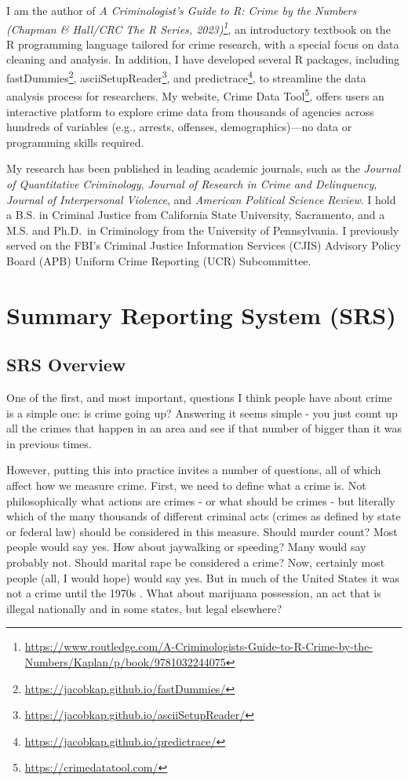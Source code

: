 \documentclass[
]{krantz}
\renewcommand{\href}[2]{#2\footnote{\url{#1}}}
\begin{document}
I am the author of
\emph{\href{https://www.routledge.com/A-Criminologists-Guide-to-R-Crime-by-the-Numbers/Kaplan/p/book/9781032244075}{A
Criminologist's Guide to R: Crime by the Numbers (Chapman \&
Hall/CRC The R Series, 2023)}}, an introductory textbook on
the R programming language tailored for crime research, with
a special focus on data cleaning and analysis. In addition,
I have developed several R packages, including
\href{https://jacobkap.github.io/fastDummies/}{fastDummies},
\href{https://jacobkap.github.io/asciiSetupReader/}{asciiSetupReader},
and
\href{https://jacobkap.github.io/predictrace/}{predictrace},
to streamline the data analysis process for researchers. My
website, \href{https://crimedatatool.com/}{Crime Data Tool},
offers users an interactive platform to explore crime data
from thousands of agencies across hundreds of variables
(e.g., arrests, offenses, demographics)---no data or
programming skills required.

My research has been published in leading academic journals,
such as the \emph{Journal of Quantitative Criminology},
\emph{Journal of Research in Crime and Delinquency},
\emph{Journal of Interpersonal Violence}, and \emph{American
Political Science Review}. I hold a B.S. in Criminal Justice
from California State University, Sacramento, and a M.S. and
Ph.D.~in Criminology from the University of Pennsylvania. I
previously served on the FBI's Criminal Justice Information
Services (CJIS) Advisory Policy Board (APB) Uniform Crime
Reporting (UCR) Subcommittee.

\mainmatter

\part{Summary Reporting System
(SRS)}\label{part-summary-reporting-system-srs}

\chapter{SRS Overview}\label{SRSGeneral}

One of the first, and most important, questions I think
people have about crime is a simple one: is crime going up?
Answering it seems simple - you just count up all the crimes
that happen in an area and see if that number of bigger than
it was in previous times.

However, putting this into practice invites a number of
questions, all of which affect how we measure crime. First,
we need to define what a crime is. Not philosophically what
actions are crimes - or what should be crimes - but
literally which of the many thousands of different criminal
acts (crimes as defined by state or federal law) should be
considered in this measure. Should murder count? Most people
would say yes. How about jaywalking or speeding? Many would
say probably not. Should marital rape be considered a crime?
Now, certainly most people (all, I would hope) would say
yes. But in much of the United States it was not a crime
until the 1970s
\citep{bennice2003marital, mcmahon2009criminalizing}. What
about marijuana possession, an act that is illegal
nationally and in some states, but legal elsewhere?
\end{document}
